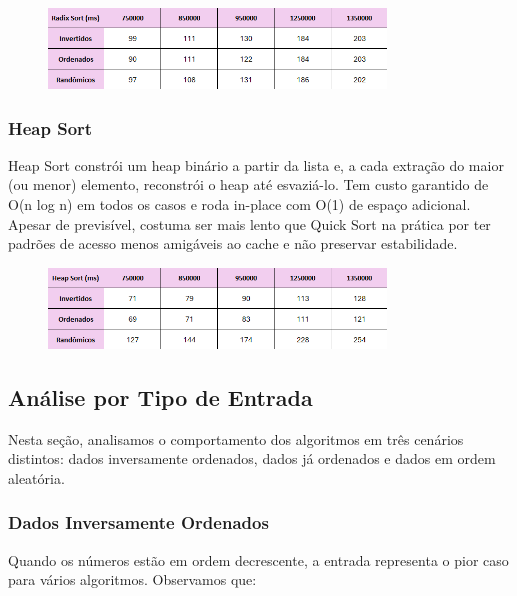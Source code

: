 \documentclass[a4paper, 12pt]{article}
\begin{document}
            \begin{figure}[ht]
                \centering
                \includegraphics[width=0.8\textwidth]{images/radix.png}
            \end{figure}

        \subsubsection{Heap Sort}
            Heap Sort constrói um heap binário a partir da lista e, a cada extração do maior (ou menor) elemento, reconstrói o heap até esvaziá-lo. Tem custo garantido de O(n log n) em todos os casos e roda in-place com O(1) de espaço adicional. Apesar de previsível, costuma ser mais lento que Quick Sort na prática por ter padrões de acesso menos amigáveis ao cache e não preservar estabilidade.

            \begin{figure}[ht]
                \centering
                \includegraphics[width=0.8\textwidth]{images/heap.png}
            \end{figure}
    \subsection{Análise por Tipo de Entrada}
        Nesta seção, analisamos o comportamento dos algoritmos em três cenários distintos: dados inversamente ordenados, dados já ordenados e dados em ordem aleatória.

        \subsubsection{Dados Inversamente Ordenados}
            Quando os números estão em ordem decrescente, a entrada representa o pior caso para vários algoritmos. Observamos que:
\end{document}
